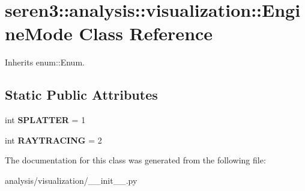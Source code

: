 \hypertarget{classseren3_1_1analysis_1_1visualization_1_1EngineMode}{
\section{seren3::analysis::visualization::EngineMode Class Reference}
\label{classseren3_1_1analysis_1_1visualization_1_1EngineMode}
}


Inherits enum::Enum.\subsection*{Static Public Attributes}
\begin{DoxyCompactItemize}
\item 
\hypertarget{classseren3_1_1analysis_1_1visualization_1_1EngineMode_a55c30ed1fa7779849d5a06d0dff37a08}{
int {\bfseries SPLATTER} = 1}
\label{classseren3_1_1analysis_1_1visualization_1_1EngineMode_a55c30ed1fa7779849d5a06d0dff37a08}

\item 
\hypertarget{classseren3_1_1analysis_1_1visualization_1_1EngineMode_a813ffbc9933a451e98e133e3009fc888}{
int {\bfseries RAYTRACING} = 2}
\label{classseren3_1_1analysis_1_1visualization_1_1EngineMode_a813ffbc9933a451e98e133e3009fc888}

\end{DoxyCompactItemize}


The documentation for this class was generated from the following file:\begin{DoxyCompactItemize}
\item 
analysis/visualization/\_\-\_\-init\_\-\_\-.py\end{DoxyCompactItemize}
